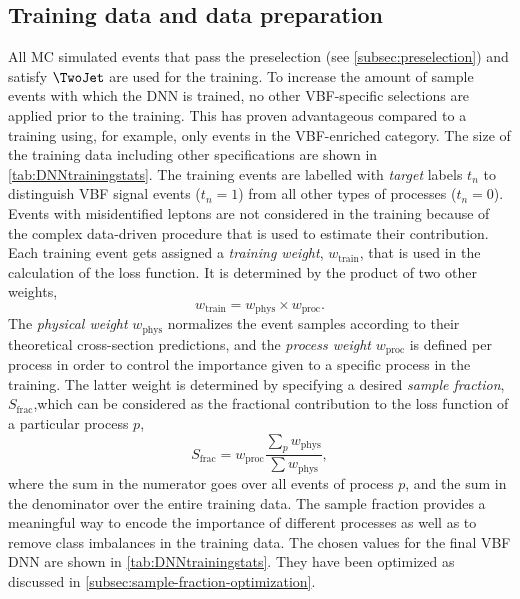 \subsection{Training data and data preparation}
\label{subsec:training-data}
All MC simulated events that pass the preselection (see \cref{subsec:preselection}) and satisfy $\TwoJet$ are used for the training. To increase the amount of sample events with which the DNN is trained, no other VBF-specific selections are applied prior to the training. This has proven advantageous compared to a training using, for example, only events in the VBF-enriched \TwoJet category. The size of the training data including other specifications are shown in \cref{tab:DNNtrainingstats}. 
The training events are labelled with \emph{target} labels $t_n$ to distinguish VBF signal events ($t_n = 1$) from all other types of processes ($t_n = 0$).
Events with misidentified leptons are not considered in the training because of the complex data-driven procedure that is used to estimate their contribution.
Each training event gets assigned a \emph{training weight}, $w_\text{train}$, that is used in the calculation of the loss function. It is determined by the product of two other weights, 
\begin{equation}
    w_\text{train} = w_\text{phys} \times w_\text{proc}.
\end{equation}
The \emph{physical weight} $w_\text{phys}$ normalizes the event samples according to their theoretical cross-section predictions, and the \emph{process weight} $w_\text{proc}$ is defined per process in order to control the importance given to a specific process in the training. 
The latter weight is determined by specifying a desired \emph{sample fraction}, $S_\text{frac}$,which can be considered as the fractional contribution to the loss function of a particular process $p$, 
\begin{equation}
    S_\text{frac} = w_\text{proc} \frac{\sum_{p} w_\text{phys}}{ \sum w_\text{phys}},
\end{equation}
where the sum in the numerator goes over all events of process $p$, and the sum in the denominator over the entire training data.
The sample fraction provides a meaningful way to encode the importance of different processes as well as to remove class imbalances in the training data. The chosen values for the final VBF DNN are shown in \cref{tab:DNNtrainingstats}.
They have been optimized as discussed in \cref{subsec:sample-fraction-optimization}.

